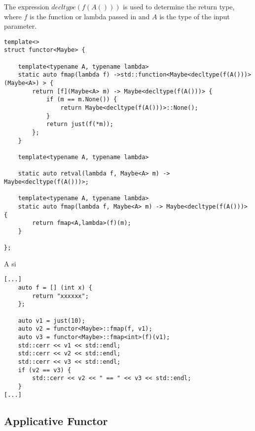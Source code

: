 \documentclass[12pt,fleqn]{article}
\begin{document}
The expression $decltype(f(A()))$ is used to determine the return type, where $f$ is the function or lambda passed in 
and $A$ is the type of the input parameter.


%
%
\begin{minipage}{\linewidth}
\begin{lstlisting}[caption=Maybe Functor, label=maybefunctor]
template<>
struct functor<Maybe> {

	template<typename A, typename lambda>
	static auto fmap(lambda f) ->std::function<Maybe<decltype(f(A()))> (Maybe<A>) > {
		return [f](Maybe<A> m) -> Maybe<decltype(f(A()))> {
			if (m == m.None()) {
				return Maybe<decltype(f(A()))>::None();
			}
			return just(f(*m));
		};
	}

	template<typename A, typename lambda>

	static auto retval(lambda f, Maybe<A> m) ->  Maybe<decltype(f(A()))>;

	template<typename A, typename lambda>
	static auto fmap(lambda f, Maybe<A> m) -> Maybe<decltype(f(A()))> {
		return fmap<A,lambda>(f)(m);
	}

};
\end{lstlisting}
\end{minipage}
%
%
%

A si

%
%
\begin{minipage}{\linewidth}
\begin{lstlisting}[caption=example of the maybe functor, label=maybefunctorexample]
[...]
	auto f = [] (int x) {
		return "xxxxxx";
	};

	auto v1 = just(10);
	auto v2 = functor<Maybe>::fmap(f, v1);
	auto v3 = functor<Maybe>::fmap<int>(f)(v1);
	std::cerr << v1 << std::endl;
	std::cerr << v2 << std::endl;
	std::cerr << v3 << std::endl;
	if (v2 == v3) {
		std::cerr << v2 << " == " << v3 << std::endl;
	}
[...]
\end{lstlisting}
\end{minipage}
%
%
%

%
\subsection{Applicative Functor}
%
\end{document}
